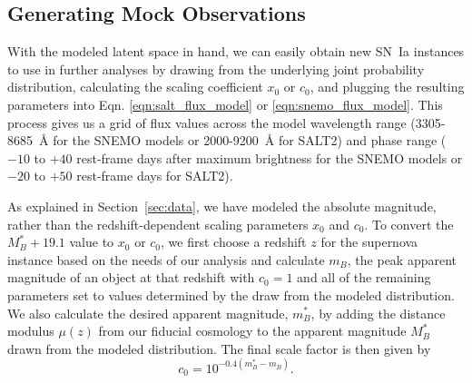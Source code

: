 
\subsection{Generating Mock Observations}
With the modeled latent space in hand, we can easily obtain new SN~Ia instances to use in further analyses by drawing from the underlying joint probability distribution, calculating the scaling coefficient $x_0$ or $c_0$, and plugging the resulting parameters into Eqn. \ref{eqn:salt_flux_model} or \ref{eqn:snemo_flux_model}. This process gives us a grid of flux values across the model wavelength range (3305-8685~\AA\; for the SNEMO models or 2000-9200~\AA\; for SALT2) and phase range ($-10$ to $+40$ rest-frame days after maximum brightness for the SNEMO models or $-20$ to $+50$ rest-frame days for SALT2).

As explained in Section~\ref{sec:data}, we have modeled the absolute magnitude, rather than the redshift-dependent scaling parameters $x_0$ and $c_0$. To convert the $M_B^* + 19.1$ value to $x_0$ or $c_0$, we first choose a redshift $z$ for the supernova instance based on the needs of our analysis and calculate $m_B$, the peak apparent magnitude of an object at that redshift with $c_0=1$ and all of the remaining parameters set to values determined by the draw from the modeled distribution. We also calculate the desired apparent magnitude, $m_B^*$, by adding the distance modulus $\mu(z)$ from our fiducial cosmology to the apparent magnitude $M_B^*$ drawn from the modeled distribution. The final scale factor is then given by 
$$c_0 = 10^{-0.4(m_B^*-m_B)}.$$


